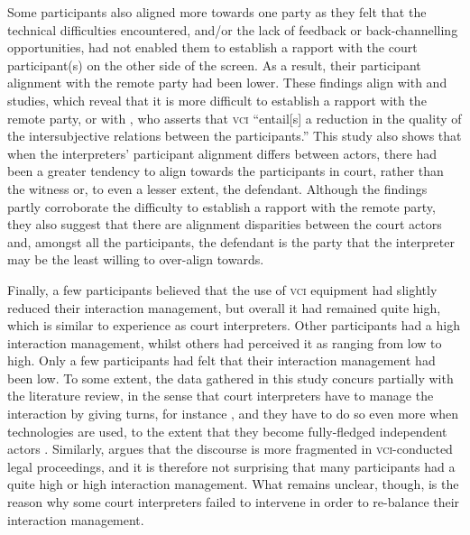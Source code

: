 \documentclass[output=paper]{langsci/langscibook}
\begin{document}
Some participants also aligned more towards one party as they felt that the technical difficulties encountered, and/or the lack of feedback or back-channell\-ing opportunities, had not enabled them to establish a rapport with the court participant(s) on the other side of the screen. As a result, their participant alignment with the remote party had been lower. These findings align with  and  studies, which reveal that it is more difficult to establish a rapport with the remote party, or with \citep[4]{Braun2016b}, who asserts that \textsc{vci} “entail[s] a reduction in the quality of the intersubjective relations between the participants.” This study also shows that when the interpreters’ participant alignment differs between actors, there had been a greater tendency to align towards the participants in court, rather than the witness or, to even a lesser extent, the defendant. Although the findings partly corroborate the difficulty to establish a rapport with the remote party, they also suggest that there are alignment disparities between the court actors and, amongst all the participants, the defendant is the party that the interpreter may be the least willing to over-align towards.

Finally, a few participants believed that the use of \textsc{vci} equipment had slightly reduced their interaction management, but overall it had remained quite high, which is similar to  experience as court interpreters. Other participants had a high interaction management, whilst others had perceived it as ranging from low to high. Only a few participants had felt that their interaction management had been low. To some extent, the data gathered in this study concurs partially with the literature review, in the sense that court interpreters have to manage the interaction by giving turns, for instance \citep{Angelelli2003,Llewellyn-Jones2014,Martin2008}, and they have to do so even more when technologies are used, to the extent that they become fully-fledged independent actors \citep{Lee2007,Rosenberg2007}. Similarly, \citet{Braun2016a} argues that the discourse is more fragmented in \textsc{vci}-conducted legal proceedings, and it is therefore not surprising that many participants had a quite high or high interaction management. What remains unclear, though, is the reason why some court interpreters failed to intervene in order to re-balance their interaction management. 
\end{document}

